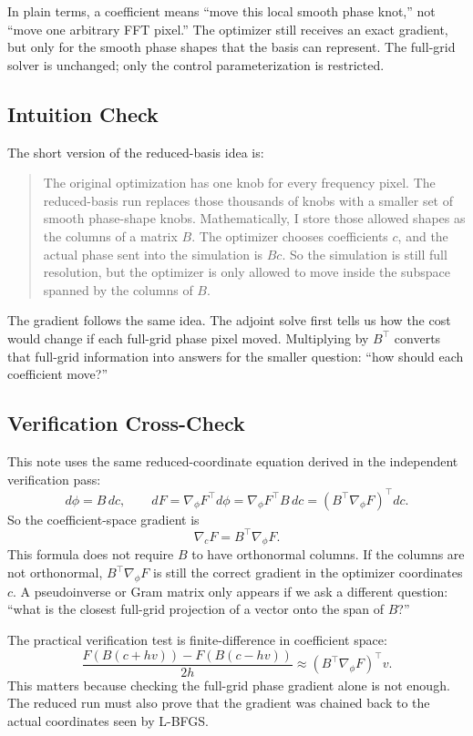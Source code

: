 \documentclass[11pt]{article}
\begin{document}
In plain terms, a coefficient means ``move this local smooth phase knot,'' not
``move one arbitrary FFT pixel.'' The optimizer still receives an exact
gradient, but only for the smooth phase shapes that the basis can represent.
The full-grid solver is unchanged; only the control parameterization is
restricted.

\subsection*{Intuition Check}

The short version of the reduced-basis idea is:

\begin{quote}
The original optimization has one knob for every frequency pixel. The
reduced-basis run replaces those thousands of knobs with a smaller set of
smooth phase-shape knobs. Mathematically, I store those allowed shapes as the
columns of a matrix \(B\). The optimizer chooses coefficients \(c\), and the
actual phase sent into the simulation is \(Bc\). So the simulation is still
full resolution, but the optimizer is only allowed to move inside the subspace
spanned by the columns of \(B\).
\end{quote}

The gradient follows the same idea. The adjoint solve first tells us how the
cost would change if each full-grid phase pixel moved. Multiplying by
\(B^\top\) converts that full-grid information into answers for the smaller
question: ``how should each coefficient move?''

\subsection*{Verification Cross-Check}

This note uses the same reduced-coordinate equation derived in the independent
verification pass:
\[
    d\phi = B\,dc,
    \qquad
    dF = \nabla_\phi F^\top d\phi
        = \nabla_\phi F^\top B\,dc
        = (B^\top\nabla_\phi F)^\top dc.
\]
So the coefficient-space gradient is
\[
    \boxed{\nabla_c F = B^\top \nabla_\phi F.}
\]
This formula does not require \(B\) to have orthonormal columns. If the columns
are not orthonormal, \(B^\top\nabla_\phi F\) is still the correct gradient in
the optimizer coordinates \(c\). A pseudoinverse or Gram matrix only appears if
we ask a different question: ``what is the closest full-grid projection of a
vector onto the span of \(B\)?''

The practical verification test is finite-difference in coefficient space:
\[
    \frac{F(B(c+h v))-F(B(c-h v))}{2h}
    \approx
    (B^\top\nabla_\phi F)^\top v .
\]
This matters because checking the full-grid phase gradient alone is not enough.
The reduced run must also prove that the gradient was chained back to the
actual coordinates seen by L-BFGS.
\end{document}
